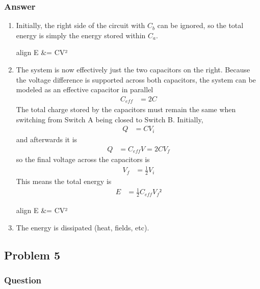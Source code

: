 \subsubsection{Answer}
\begin{enumerate}
	\item
		Initially, the right side of the circuit with $C_b$ can be ignored,
		so the total energy is simply the energy stored within $C_a$.
		\begin{empheq}[box=\fbox]{align}
			E &=  CV²
		\end{empheq}
	\item
		The system is now effectively just the two capacitors on the right.
		Because the voltage difference is supported across both capacitors,
		the system can be modeled as an effective capacitor in parallel
		\begin{align*}
			C_{eff} &= 2C
		\end{align*}
		The total charge stored by the capacitors must remain the same when
		switching from Switch A being closed to Switch B. Initially,
		\begin{align*}
			Q &= CV_i
		\end{align*}
		and afterwards it is
		\begin{align*}
			Q &= C_{eff}V = 2CV_f
		\end{align*}
		so the final voltage across the capacitors is
		\begin{align*}
			V_f &= \frac 12 V_i
		\end{align*}
		This means the total energy is
		\begin{align*}
			E &= \frac 12 C_{eff} {V_f}²
		\end{align*}
		\begin{empheq}[box=\fbox]{align}
			E &=  CV²
		\end{empheq}
	\item
		The energy is dissipated (heat, fields, etc).
\end{enumerate}

\clearpage
\subsection{Problem 5}
\subsubsection{Question}

